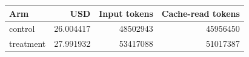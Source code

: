 \begin{tabular}{lrrr}
\toprule
Arm & USD & Input tokens & Cache-read tokens \\
\midrule
control & 26.004417 & 48502943 & 45956450 \\
treatment & 27.991932 & 53417088 & 51017387 \\
\bottomrule
\end{tabular}
